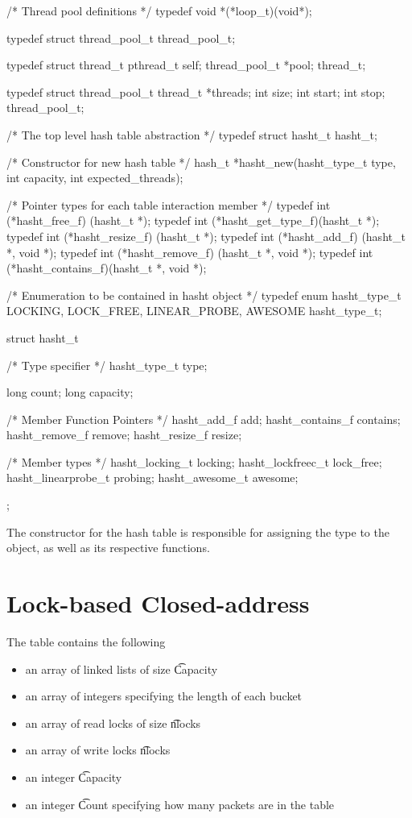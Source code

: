 \begin{code}

/* Thread pool definitions */
typedef void *(*loop_t)(void*);

typedef struct thread_pool_t thread_pool_t;

typedef struct thread_t {
    pthread_t self;
    thread_pool_t *pool;
} thread_t;

typedef struct thread_pool_t{
    thread_t *threads;
    int size;
    int start;
    int stop;
} thread_pool_t;

/* The top level hash table abstraction */
typedef struct hasht_t hasht_t;   

/* Constructor for new hash table */
hash_t *hasht_new(hasht_type_t type, int capacity, int expected_threads);

/* Pointer types for each table interaction member */
typedef int (*hasht_free_f)    (hasht_t *);
typedef int (*hasht_get_type_f)(hasht_t *);
typedef int (*hasht_resize_f)  (hasht_t *);
typedef int (*hasht_add_f)     (hasht_t *, void *);
typedef int (*hasht_remove_f)  (hasht_t *, void *);
typedef int (*hasht_contains_f)(hasht_t *, void *);

/* Enumeration to be contained in hasht object */
typedef enum hasht_type_t 
{
  LOCKING,
  LOCK_FREE,
  LINEAR_PROBE,
  AWESOME
} hasht_type_t;

struct hasht_t 
{
  /* Type specifier */
  hasht_type_t type;

  long count;
  long capacity;

  /* Member Function Pointers */
  hasht_add_f        add;
  hasht_contains_f   contains;
  hasht_remove_f     remove;
  hasht_resize_f     resize;

  /* Member types */
  hasht_locking_t      locking;
  hasht_lockfreec_t    lock_free;
  hasht_linearprobe_t  probing;
  hasht_awesome_t      awesome;
}; 

\end{code}

The constructor for the hash table is responsible for assigning the
type to the object, as well as its respective functions. 


\section{Lock-based Closed-address}

The table contains the following
\begin{itemize}
\item an array of linked lists of size \t{Capacity}
\item an array of integers specifying the length of each bucket
\item an array of read locks of size \t{nlocks}
\item an array of write locks \t{nlocks}
\item an integer \t{Capacity}
\item an integer \t{Count} specifying how many packets are in the table
\end{itemize}

